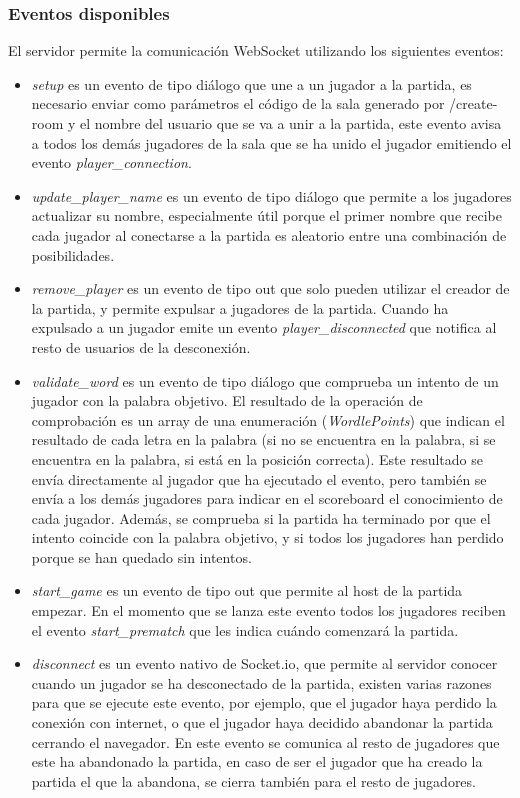 \subsubsection{Eventos disponibles}
El servidor permite la comunicación WebSocket utilizando los siguientes eventos:

\begin{itemize}
	\item \textit{setup} es un evento de tipo diálogo que une a un jugador a la partida, es necesario enviar como parámetros el código de la sala generado por /create-room y el nombre del usuario que se va a unir a la partida, este evento avisa a todos los demás jugadores de la sala que se ha unido el jugador emitiendo el evento \textit{player\_connection}.
	\item \textit{update\_player\_name} es un evento de tipo diálogo que permite a los jugadores actualizar su nombre, especialmente útil porque el primer nombre que recibe cada jugador al conectarse a la partida es aleatorio entre una combinación de posibilidades.
	\item \textit{remove\_player} es un evento de tipo out que solo pueden utilizar el creador de la partida, y permite expulsar a jugadores de la partida. Cuando ha expulsado a un jugador emite un evento \textit{player\_disconnected} que notifica al resto de usuarios de la desconexión.
	\item \textit{validate\_word} es un evento de tipo diálogo que comprueba un intento de un jugador con la palabra objetivo. El resultado de la operación de comprobación es un array de una enumeración (\textit{WordlePoints}) que indican el resultado de cada letra en la palabra (si no se encuentra en la palabra, si se encuentra en la palabra, si está en la posición correcta). Este resultado se envía directamente al jugador que ha ejecutado el evento, pero también se envía a los demás jugadores para indicar en el scoreboard el conocimiento de cada jugador. Además, se comprueba si la partida ha terminado por que el intento coincide con la palabra objetivo, y si todos los jugadores han perdido porque se han quedado sin intentos.
	\item \textit{start\_game} es un evento de tipo out que permite al host de la partida empezar. En el momento que se lanza este evento todos los jugadores reciben el evento \textit{start\_prematch} que les indica cuándo comenzará la partida.
	\item \textit{disconnect} es un evento nativo de Socket.io, que permite al servidor conocer cuando un jugador se ha desconectado de la partida, existen varias razones para que se ejecute este evento, por ejemplo, que el jugador haya perdido la conexión con internet, o que el jugador haya decidido abandonar la partida cerrando el navegador. En este evento se comunica al resto de jugadores que este ha abandonado la partida, en caso de ser el jugador que ha creado la partida el que la abandona, se cierra también para el resto de jugadores.
\end{itemize}


